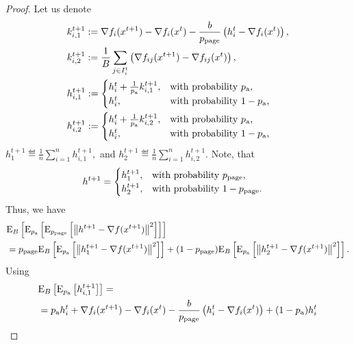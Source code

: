 \documentclass{article}
\newcommand*{\probavailable}{\ensuremath{p_{\textnormal{a}}}}
\newcommand*{\probpage}{\ensuremath{p_{\text{page}}}}
\begin{document}
\begin{proof}
  Let us denote
  \begin{align*}
      &k^{t+1}_{i, 1} \eqdef \nabla f_i(x^{t+1}) - \nabla f_i(x^{t}) - \frac{b}{\probpage} \left(h^t_i - \nabla f_i(x^{t})\right), \\
      &k^{t+1}_{i, 2} \eqdef \frac{1}{B}\sum_{j \in I^t_i}\left(\nabla f_{ij}(x^{t+1}) - \nabla f_{ij}(x^{t})\right), \\
      &h^{t+1}_{i,1} \eqdef \begin{cases}
          h^t_i + \frac{1}{\probavailable} k^{t+1}_{i, 1},& \textnormal{with probability $\probavailable$,} \\
          h^t_i, & \textnormal{with probability $1 - \probavailable$,} 
      \end{cases}  \\
      &h^{t+1}_{i,2} \eqdef \begin{cases}
          h^t_i + \frac{1}{\probavailable} k^{t+1}_{i, 2},& \textnormal{with probability $\probavailable$,} \\
          h^t_i, & \textnormal{with probability $1 - \probavailable$,}
      \end{cases}  \\
  \end{align*}
  $h^{t+1}_{1} \eqdef \frac{1}{n}\sum_{i=1}^n h^{t+1}_{i,1},$ and $h^{t+1}_{2} \eqdef \frac{1}{n}\sum_{i=1}^n h^{t+1}_{i,2}.$ Note, that
  \begin{align*}
    &h^{t+1} = \begin{cases}
      h^{t+1}_{1},& \textnormal{with probability $\probpage$,} \\
      h^{t+1}_{2},& \textnormal{with probability $1 - \probpage$.} 
    \end{cases}
  \end{align*}
  Thus, we have
  \begin{align*}
    &\ExpSub{B}{\ExpSub{\probavailable}{\ExpSub{\probpage}{\norm{h^{t+1} - \nabla f(x^{t+1})}^2}}} \\
    &=\probpage\ExpSub{B}{\ExpSub{\probavailable}{\norm{h^{t+1}_{1} - \nabla f(x^{t+1})}^2}} + (1 - \probpage)\ExpSub{B}{\ExpSub{\probavailable}{\norm{h^{t+1}_{2} - \nabla f(x^{t+1})}^2}}.\\
  \end{align*}
  Using 
  \begin{align*}
    &\ExpSub{B}{\ExpSub{\probavailable}{h^{t+1}_{i,1}}} = \\
    &=\probavailable h^t_i +  \nabla f_i(x^{t+1}) - \nabla f_i(x^{t}) - \frac{b}{\probpage} \left(h^t_i - \nabla f_i(x^{t})\right) + (1 - \probavailable) h^t_i \\

\end{align*}
\end{proof}
\end{document}
